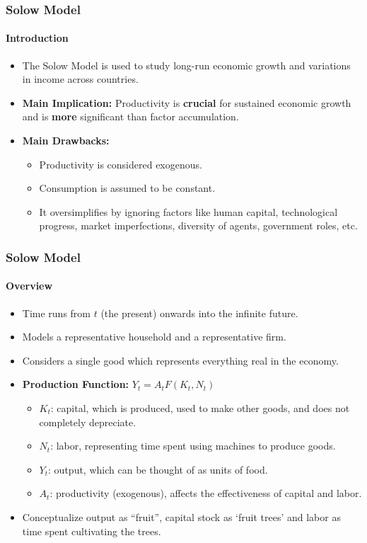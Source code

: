 \documentclass{beamer}
\begin{document}
\begin{frame}
    \frametitle{Solow Model}
    \framesubtitle{Introduction}
    \begin{itemize}
        \item The Solow Model \parencite{Solow_1956} is used to study long-run economic growth and 
        variations in income across countries.\pause
        \item \textbf{Main Implication:} 
        Productivity is \textbf{crucial} for sustained economic growth and is 
        \textbf{more} significant than factor accumulation.\pause
        \item \textbf{Main Drawbacks:}
        \begin{itemize}
            \item Productivity is considered exogenous.
            \item Consumption is assumed to be constant.
            \item It oversimplifies by ignoring factors like 
            human capital, technological progress, market imperfections, 
            diversity of agents, government roles, etc.
        \end{itemize}
    \end{itemize}
\end{frame}

\begin{frame}
    \frametitle{Solow Model}
    \framesubtitle{Overview}
    \begin{itemize}
        \item Time runs from \( t \) (the present) onwards into the infinite future.
        \item Models a representative household and a representative firm.
        \item Considers a single good which represents everything real in the economy.\pause
        \item \textbf{Production Function:} \( Y_t = A_t F(K_t, N_t) \)
        \begin{itemize}
            \item \( K_t \): capital, which is produced, used to make other goods, and does not completely depreciate.
            \item \( N_t \): labor, representing time spent using machines to produce goods.
            \item \( Y_t \): output, which can be thought of as units of food.
            \item \( A_t \): productivity (exogenous), affects the effectiveness of capital and labor.
        \end{itemize}
        \pause
        \item 
        Conceptualize output as \enquote{fruit}, capital stock as \enquote*{fruit trees} 
        and labor as time spent cultivating the trees.
    \end{itemize}
\end{frame}
\end{document}
